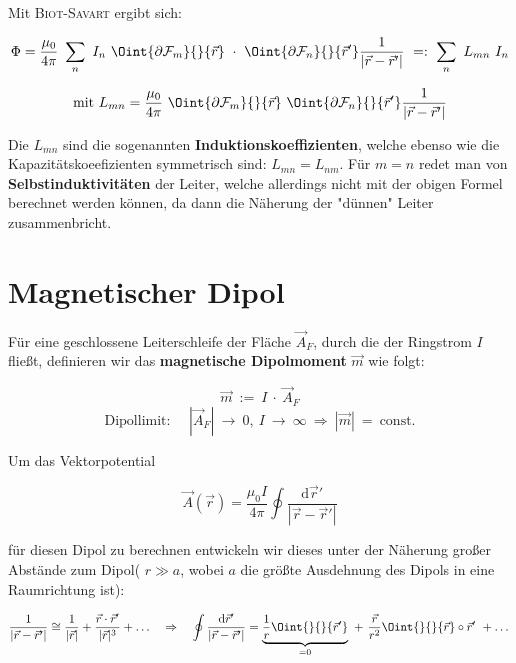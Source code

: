 Mit \textsc{Biot-Savart} ergibt sich:

\begin{equation*}
\Phi = \frac{\mu_0}{4\pi}\ \sum_n \ I_n \ \Oint{\partial\mathcal{F}_m}{}{\vec{r}}\ \cdot \ \Oint{\partial\mathcal{F}_n}{}{\vec{r}'}\frac{1}{|\vec{r}-\vec{r}'|} \ =: \ \sum_n \ L_{mn} \ I_n
\end{equation*}

\begin{equation*}
\text{mit } L_{mn} = \frac{\mu_0}{4\pi} \ \Oint{\partial\mathcal{F}_m}{}{\vec{r}}\ \Oint{\partial\mathcal{F}_n}{}{\vec{r}'}\frac{1}{|\vec{r}-\vec{r}'|}
\end{equation*}

Die $L_{mn}$ sind die sogenannten \textbf{Induktionskoeffizienten}, welche ebenso wie die Kapazitätskoeefizienten symmetrisch sind: $L_{mn} = L_{nm}$. Für $m=n$ redet man von \textbf{Selbstinduktivitäten} der Leiter, welche allerdings  nicht mit der obigen Formel berechnet werden können, da dann die Näherung der "dünnen" Leiter zusammenbricht.

\section{Magnetischer Dipol}

Für eine geschlossene Leiterschleife der Fläche $\vec{A}_F$, durch die der Ringstrom $I$ fließt, definieren wir das \textbf{magnetische Dipolmoment} $\vec{m}$ wie folgt:

\begin{equation*}
\vec{m} \ := \ I \ \cdot \ \vec{A}_F
\end{equation*}
\begin{equation*}
\text{Dipollimit: } \quad |\vec{A}_F| \ \rightarrow \ 0, \ I \ \rightarrow \ \infty \ \Rightarrow \ |\vec{m}| \ = \ \text{const.}
\end{equation*}

Um das Vektorpotential

\begin{equation*}
\vec{A}(\vec{r}) = \frac{\mu_0 I}{4\pi}\oint\frac{\mathrm{d}\vec{r}'}{|\vec{r}-\vec{r}'|}
\end{equation*}

für diesen Dipol zu berechnen entwickeln wir dieses unter der Näherung großer Abstände zum Dipol( $r\gg a$, wobei $a$ die größte Ausdehnung des Dipols in eine Raumrichtung ist):

\begin{equation*}
\frac{1}{|\vec{r}-\vec{r}'|} \cong  \frac{1}{|\vec{r}|} + \frac{\vec{r}\cdot\vec{r}'}{|\vec{r}|^3} + \dotsc \quad \Rightarrow \quad \oint\frac{\mathrm{d}\vec{r}'}{|\vec{r}-\vec{r}'|} = \underbrace{\frac{1}{r} \Oint{}{}{\vec{r}'}}_{=0} \ + \ \frac{\vec{r}}{r^2}\Oint{}{}{\vec{r}} \circ\vec{r}' \ + \dotsc
\end{equation*}

